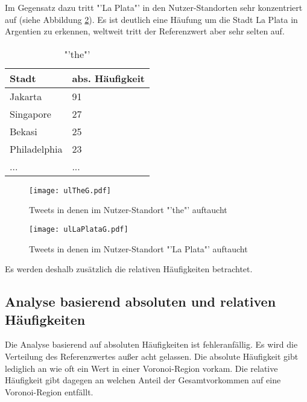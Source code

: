 			Im Gegensatz dazu tritt "'La Plata"' in den Nutzer-Standorten sehr konzentriert auf (siehe Abbildung \ref{img:ULlaPlata}).
			Es ist deutlich eine Häufung um die Stadt La Plata in Argentien zu erkennen, weltweit tritt der Referenzwert aber sehr selten auf.

			\begin{table}[h]
				\centering
				\caption{"'the"'}
				\label{tab:theAbs}
				\begin{tabular}{|l|l|}
				\hline
				Stadt             & abs. Häufigkeit \\ \hline \hline
				Jakarta           & 91              \\ \hline
				Singapore         & 27              \\ \hline
				Bekasi            & 25              \\ \hline
				Philadelphia      & 23              \\ \hline
				... & ... \\ \hline
				\end{tabular}
				\end{table}

			\begin{figure} 
				\begin{center}
					\texttt{[image: ulTheG.pdf]}
					\caption{Tweets in denen im Nutzer-Standort "'the"' auftaucht}
					\label{img:ULThe}
					\end{center}
				\end{figure}
			\begin{figure}

			\begin{center}
					\texttt{[image: ulLaPlataG.pdf]}
					\caption{Tweets in denen im Nutzer-Standort "'La Plata"' auftaucht}
					\label{img:ULlaPlata}
				\end{center}
			\end{figure}	


			Es werden deshalb zusätzlich die relativen Häufigkeiten betrachtet.	

		\subsection{Analyse basierend absoluten und relativen Häufigkeiten} \label{sub:Analyse-absRel} 

			Die Analyse basierend auf absoluten Häufigkeiten ist fehleranfällig. 
			Es wird die Verteilung des Referenzwertes außer acht gelassen.
			Die absolute Häufigkeit gibt lediglich an wie oft ein Wert in einer Voronoi-Region vorkam.
			Die relative Häufigkeit gibt dagegen an welchen Anteil der Gesamtvorkommen auf eine Voronoi-Region entfällt.

